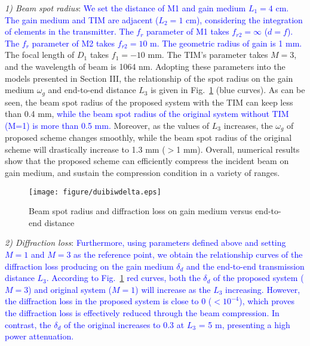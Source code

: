 \documentclass{IEEEtran}
\begin{document}
\emph{1) Beam spot radius}: \textcolor{blue}{We set the distance of M1 and gain medium $L_1=4$ cm. The gain medium and TIM are adjacent ($L_2=1$ cm), considering the integration of elements in the transmitter. The $f_r$ parameter of M1 takes $f_{r2}=\infty$ ($d=f$). The $f_r$ parameter of M2 takes $f_{r2}=10$ m. The geometric radius of gain is 1 mm.} The focal length of $D_1$ takes $f_1 = -10$ mm. The TIM's parameter takes $M = 3$, and the wavelength of beam is 1064 nm. 
Adopting these parameters into the models presented in Section III, the relationship of the spot radius on the gain medium $\omega_{g}$ and end-to-end distance $L_3$ is given in Fig.~\ref{modespot} (blue curves). As can be seen, the beam spot radius of the proposed system with the TIM can keep less than 0.4 mm, \textcolor{blue}{while the beam spot radius of the original system without TIM (M=1) is more than 0.5 mm.} Moreover, as the values of $L_3$ increases, the $\omega_g$ of proposed scheme changes smoothly, while the beam spot radius of the original scheme will drastically increase to 1.3 mm ($>$1 mm). 
Overall, numerical results show that the proposed scheme can efficiently compress the incident beam on gain medium, and sustain the compression condition in a variety of ranges.
\begin{figure}[t]
	\centering
	\texttt{[image: figure/duibiwdelta.eps]}
	\caption{Beam spot radius and diffraction loss on gain medium versus end-to-end distance}
	\label{modespot}
\end{figure}


\emph{2) Diffraction loss}: 
\textcolor{blue}{Furthermore, using parameters defined above and setting $M=1$ and $M=3$ as the reference point, we obtain the relationship curves of the diffraction loss producing on the gain medium $\delta_d$ and the end-to-end transmission distance $L_3$. 
According to Fig.~\ref{modespot} red curves, both the $\delta_d$ of the proposed system ($M=3$) and original system ($M=1$) will increase as the $L_3$ increasing. However, the diffraction loss in the proposed system is close to 0 ($<10^{-4}$), which proves the diffraction loss is effectively reduced through the beam compression. In contrast, the $\delta_d$ of the original increases to 0.3 at $L_3$ = 5 m, presenting a high power attenuation.} 
\end{document}
